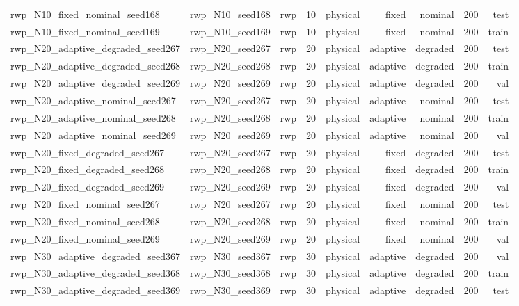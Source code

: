 \begin{tabular}{lrrrrrrrr}
rwp\_N10\_fixed\_nominal\_seed168 & rwp\_N10\_seed168 & rwp & 10 & physical & fixed & nominal & 200 & test \\
rwp\_N10\_fixed\_nominal\_seed169 & rwp\_N10\_seed169 & rwp & 10 & physical & fixed & nominal & 200 & train \\
rwp\_N20\_adaptive\_degraded\_seed267 & rwp\_N20\_seed267 & rwp & 20 & physical & adaptive & degraded & 200 & test \\
rwp\_N20\_adaptive\_degraded\_seed268 & rwp\_N20\_seed268 & rwp & 20 & physical & adaptive & degraded & 200 & train \\
rwp\_N20\_adaptive\_degraded\_seed269 & rwp\_N20\_seed269 & rwp & 20 & physical & adaptive & degraded & 200 & val \\
rwp\_N20\_adaptive\_nominal\_seed267 & rwp\_N20\_seed267 & rwp & 20 & physical & adaptive & nominal & 200 & test \\
rwp\_N20\_adaptive\_nominal\_seed268 & rwp\_N20\_seed268 & rwp & 20 & physical & adaptive & nominal & 200 & train \\
rwp\_N20\_adaptive\_nominal\_seed269 & rwp\_N20\_seed269 & rwp & 20 & physical & adaptive & nominal & 200 & val \\
rwp\_N20\_fixed\_degraded\_seed267 & rwp\_N20\_seed267 & rwp & 20 & physical & fixed & degraded & 200 & test \\
rwp\_N20\_fixed\_degraded\_seed268 & rwp\_N20\_seed268 & rwp & 20 & physical & fixed & degraded & 200 & train \\
rwp\_N20\_fixed\_degraded\_seed269 & rwp\_N20\_seed269 & rwp & 20 & physical & fixed & degraded & 200 & val \\
rwp\_N20\_fixed\_nominal\_seed267 & rwp\_N20\_seed267 & rwp & 20 & physical & fixed & nominal & 200 & test \\
rwp\_N20\_fixed\_nominal\_seed268 & rwp\_N20\_seed268 & rwp & 20 & physical & fixed & nominal & 200 & train \\
rwp\_N20\_fixed\_nominal\_seed269 & rwp\_N20\_seed269 & rwp & 20 & physical & fixed & nominal & 200 & val \\
rwp\_N30\_adaptive\_degraded\_seed367 & rwp\_N30\_seed367 & rwp & 30 & physical & adaptive & degraded & 200 & val \\
rwp\_N30\_adaptive\_degraded\_seed368 & rwp\_N30\_seed368 & rwp & 30 & physical & adaptive & degraded & 200 & train \\
rwp\_N30\_adaptive\_degraded\_seed369 & rwp\_N30\_seed369 & rwp & 30 & physical & adaptive & degraded & 200 & test \\

\end{tabular}
